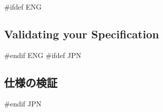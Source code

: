 \documentclass[\pformat,12pt]{article}
\newcommand{\guicmd}[1]{{\sf #1}}
\newcommand{\guicmd}[1]{{\gt #1}}
\begin{document}






#ifdef ENG
\subsection{Validating your Specification}
#endif ENG
#ifdef JPN
\subsection{仕様の検証}
#endif JPN
\end{document}
